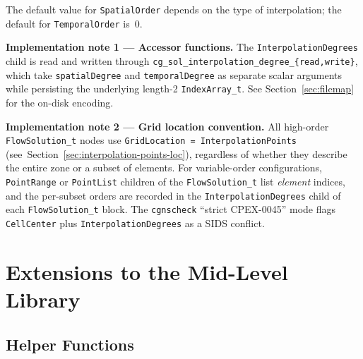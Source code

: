\documentclass[11pt,letterpaper]{article}
\newenvironment{v2quote}
  {\begin{v2quoteframe}%
   \noindent{\footnotesize\sffamily\bfseries\color{cgnsblue}v2 text}%
   \nopagebreak\par\nopagebreak\vspace{0.15em}}
  {\end{v2quoteframe}}
\begin{document}
\begin{v2quote}
The default value for \texttt{SpatialOrder} depends on the type of interpolation; the default
for \texttt{TemporalOrder} is~0.
\end{v2quote}

\noindent\textbf{Implementation note 1 --- Accessor functions.}
The \texttt{InterpolationDegrees} child is read and written through
\texttt{cg\_sol\_interpolation\_degree\_\{read,write\}}, which take \texttt{spatialDegree}
and \texttt{temporalDegree} as separate scalar arguments while persisting the underlying
length-2 \texttt{IndexArray\_t}.  See Section~\ref{sec:filemap} for the on-disk encoding.

\noindent\textbf{Implementation note 2 --- Grid location convention.}
All high-order \texttt{FlowSolution\_t} nodes use \texttt{GridLocation =
InterpolationPoints} (see~Section~\ref{sec:interpolation-points-loc}), regardless
of whether they describe the entire zone or a subset of elements.  For variable-order
configurations, \texttt{PointRange} or \texttt{PointList} children of the
\texttt{FlowSolution\_t} list \emph{element} indices, and the per-subset orders are
recorded in the \texttt{InterpolationDegrees} child of each \texttt{FlowSolution\_t}
block.  The \texttt{cgnscheck} ``strict CPEX-0045'' mode flags \texttt{CellCenter}
plus \texttt{InterpolationDegrees} as a SIDS conflict.


\section{Extensions to the Mid-Level Library}

\subsection{Helper Functions}
\end{document}
